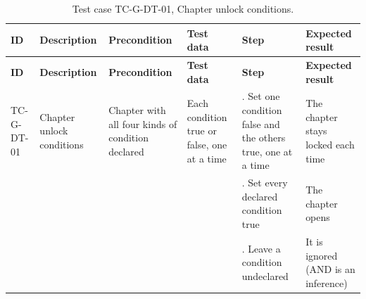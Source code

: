 {\footnotesize{}\renewcommand{\arraystretch}{1.1}
\begin{longtable}{|>{\raggedright\arraybackslash}p{}|>{\raggedright\arraybackslash}p{}|>{\raggedright\arraybackslash}p{}|>{\raggedright\arraybackslash}p{}|>{\raggedright\arraybackslash}p{}|>{\raggedright\arraybackslash}p{}|}
\caption{Test case TC-G-DT-01, Chapter unlock conditions.} \\
\hline
\textbf{ID} & \textbf{Description} & \textbf{Precondition} & \textbf{Test data} & \textbf{Step} & \textbf{Expected result} \\ \hline
\endfirsthead
\hline
\textbf{ID} & \textbf{Description} & \textbf{Precondition} & \textbf{Test data} & \textbf{Step} & \textbf{Expected result} \\ \hline
\endhead
TC-G-DT-01 & Chapter unlock conditions & Chapter with all four kinds of condition declared & Each condition true or false, one at a time & 1. Set one condition false and the others true, one at a time & The chapter stays locked each time \\ \cline{5-6}
 &  &  &  & 2. Set every declared condition true & The chapter opens \\ \cline{5-6}
 &  &  &  & 3. Leave a condition undeclared & It is ignored (AND is an inference) \\ \hline
\end{longtable}
}

